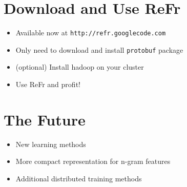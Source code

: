 \documentclass[noback,portrait,twocolumn]{cuposter}
\begin{document}
\section{Download and Use ReFr}
\begin{itemize}
\item Available now at \texttt{http://refr.googlecode.com}
\item Only need to download and install \texttt{protobuf} package
\item (optional) Install hadoop on your cluster
\item Use ReFr and profit!
\end{itemize}

\section{The Future}
\begin{itemize}
\item New learning methods
\item More compact representation for n-gram features
\item Additional distributed training methods
\end{itemize}

\small


\end{document}
